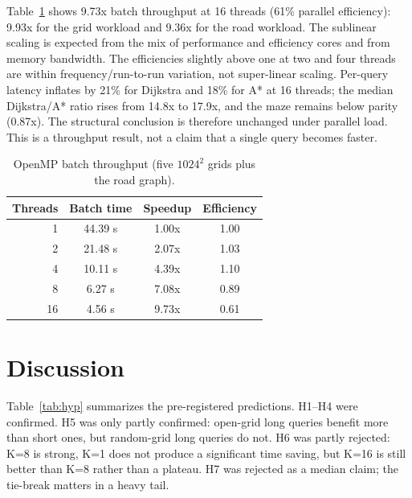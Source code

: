 \documentclass[conference,10pt]{IEEEtran}
\begin{document}
Table~\ref{tab:omp} shows 9.73x batch throughput at 16 threads (61\% parallel
efficiency): 9.93x for the grid workload and 9.36x for the road workload.  The
sublinear scaling is expected from the mix of performance and efficiency cores
and from memory bandwidth.  The efficiencies slightly above one at two and four
threads are within frequency/run-to-run variation, not super-linear scaling.  Per-query latency inflates by 21\% for Dijkstra and
18\% for A* at 16 threads; the median Dijkstra/A* ratio rises from 14.8x to
17.9x, and the maze remains below parity (0.87x).  The structural conclusion is
therefore unchanged under parallel load.  This is a throughput result, not a
claim that a single query becomes faster.

\begin{table}[!t]
\centering
\caption{OpenMP batch throughput (five $1024^2$ grids plus the road graph).}
\label{tab:omp}
\footnotesize
\setlength{\tabcolsep}{3pt}
\begin{tabular}{rccc}
\toprule
Threads & Batch time & Speedup & Efficiency\\
\midrule
1 & 44.39 s & 1.00x & 1.00\\
2 & 21.48 s & 2.07x & 1.03\\
4 & 10.11 s & 4.39x & 1.10\\
8 & 6.27 s & 7.08x & 0.89\\
16 & 4.56 s & 9.73x & 0.61\\
\bottomrule
\end{tabular}
\end{table}

\section{Discussion}
\label{sec:discussion}

Table~\ref{tab:hyp} summarizes the pre-registered predictions.  H1--H4 were
confirmed.  H5 was only partly confirmed: open-grid long queries benefit more
than short ones, but random-grid long queries do not.  H6 was partly rejected:
K=8 is strong, K=1 does not produce a significant time saving, but K=16 is
still better than K=8 rather than a plateau.  H7 was rejected as a median
claim; the tie-break matters in a heavy tail.
\end{document}
